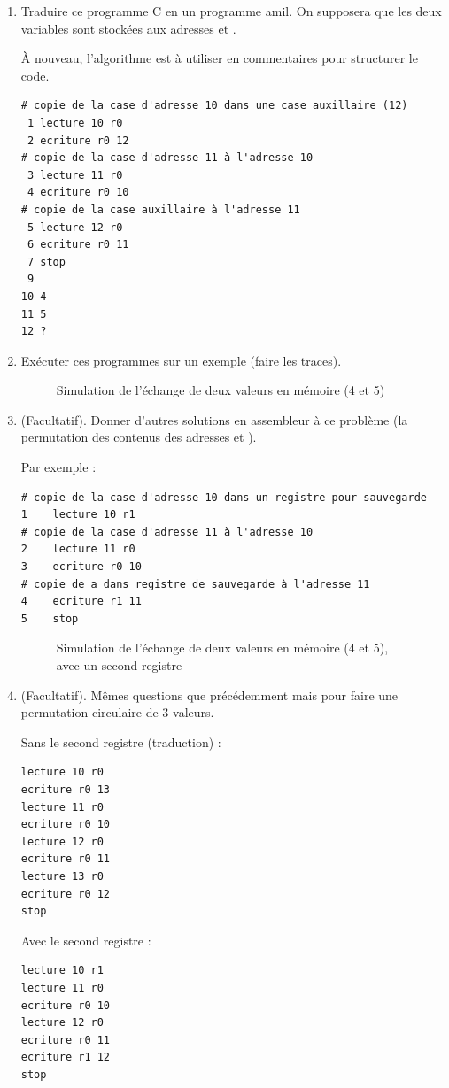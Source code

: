 \begin{enumerate}
\item Traduire ce programme C en un programme amil. On supposera que les deux variables sont stockées aux adresses  et .
  \begin{correction}
    À nouveau, l'algorithme est à utiliser en commentaires pour
      structurer le code.
\begin{verbatim}
# copie de la case d'adresse 10 dans une case auxillaire (12)
 1 lecture 10 r0
 2 ecriture r0 12
# copie de la case d'adresse 11 à l'adresse 10
 3 lecture 11 r0
 4 ecriture r0 10
# copie de la case auxillaire à l'adresse 11
 5 lecture 12 r0
 6 ecriture r0 11
 7 stop
 9 
10 4
11 5
12 ?
\end{verbatim}
  \end{correction}
\item Exécuter ces programmes sur un exemple (faire les traces).
\begin{correction}
 \begin{figure}
  \centering
  
  \caption{Simulation de l'échange de deux valeurs en mémoire (4 et 5)}
  \label{simmax1}
\end{figure}
  \end{correction}
\item (Facultatif). Donner d'autres solutions en assembleur à ce problème (la permutation des contenus des adresses  et ).
  \begin{correction}
Par exemple : 
\begin{verbatim}
# copie de la case d'adresse 10 dans un registre pour sauvegarde
1    lecture 10 r1
# copie de la case d'adresse 11 à l'adresse 10
2    lecture 11 r0
3    ecriture r0 10
# copie de a dans registre de sauvegarde à l'adresse 11
4    ecriture r1 11
5    stop
\end{verbatim}
\begin{figure}
  \centering
  
  \caption{Simulation de l'échange de deux valeurs en mémoire (4 et 5), avec un second registre}
  \label{simmax1}
\end{figure}
  \end{correction}

\item (Facultatif). Mêmes questions que précédemment mais pour faire une permutation
  circulaire de 3 valeurs.

  \begin{correction}    


{\small
{}
}

Sans le second registre (traduction) :
\begin{verbatim}
lecture 10 r0  
ecriture r0 13 
lecture 11 r0  
ecriture r0 10 
lecture 12 r0  
ecriture r0 11 
lecture 13 r0  
ecriture r0 12 
stop
\end{verbatim}
Avec le second registre :
\begin{verbatim}
lecture 10 r1  
lecture 11 r0  
ecriture r0 10 
lecture 12 r0  
ecriture r0 11 
ecriture r1 12 
stop
\end{verbatim}
\end{correction}
\end{enumerate}



